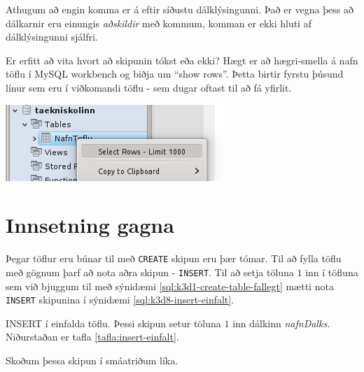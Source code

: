 Athugum að engin komma er á eftir síðustu dálklýsingunni. Það er vegna þess að dálkarnir eru einungis \emph{aðskildir} með kommum, komman er ekki hluti af dálklýsingunni sjálfri.

\begin{marginfigure}
\caption[Að sjá töflu í Workbench]{Er erfitt að vita hvort að skipunin tókst eða ekki? Hægt er að hægri-smella á nafn töflu í MySQL workbench og biðja um ``show rows''. Þetta birtir fyrstu þúsund línur sem eru í viðkomandi töflu - sem dugar oftast til að fá yfirlit.}
\label{mynd:}
\centering
\includegraphics[width=\linewidth]{myndir/workbench-select-rows}
\end{marginfigure}

\section{Innsetning gagna} %
\label{undirkafli:innsetning}
Þegar töflur eru búnar til með \verb|CREATE| skipun eru þær tómar. Til að fylla töflu með gögnum þarf að nota aðra skipun - \verb|INSERT|. Til að setja töluna $1$ inn í töfluna sem við bjuggum til með sýnidæmi \ref{sql:k3d1-create-table-fallegt} mætti nota \verb|INSERT| skipunina í sýnidæmi \ref{sql:k3d8-insert-einfalt}.

\begin{example}
\caption[INSERT í einfalda töflu]{INSERT í einfalda töflu. Þessi skipun setur töluna $1$ inn dálkinn \emph{nafnDalks}. Niðurstaðan er tafla \ref{tafla:insert-einfalt}.}
\label{sql:k3d8-insert-einfalt}
\centering
{}
\end{example}

Skoðum þessa skipun í smáatriðum líka. 

